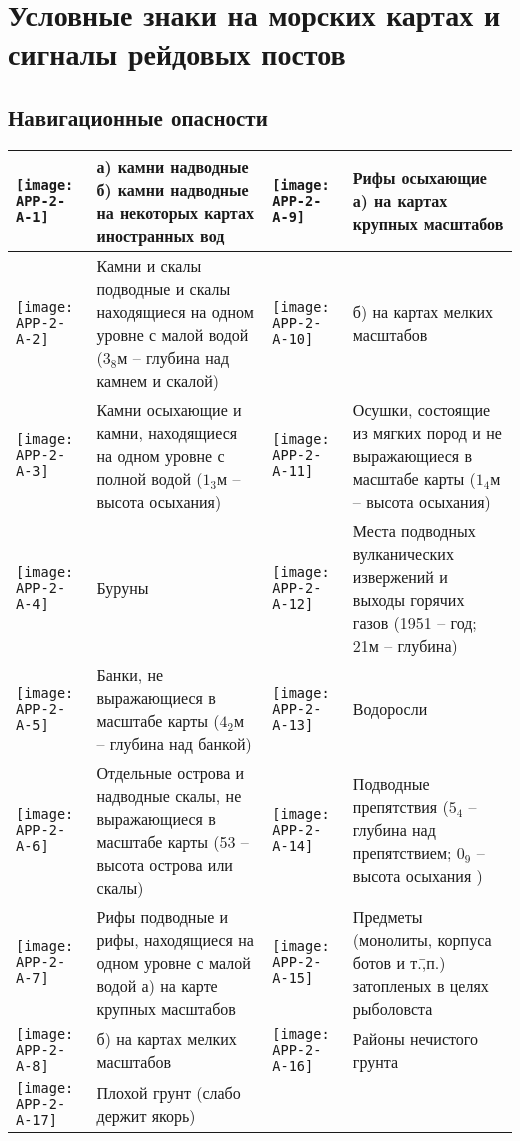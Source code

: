 \chapter{Условные знаки на морских картах и сигналы рейдовых постов}\label{app:2}

\section{Навигационные опасности}\label{app:2a}

\small
\begin{longtable}{M|m{0.2\textwidth}|M|m{0.2\textwidth}}
  \toprule
  \texttt{[image: APP-2-A-1]} & а) камни надводные \newline б) камни надводные на некоторых картах иностранных вод &
  \texttt{[image: APP-2-A-9]} & Рифы осыхающие \newline а) на картах крупных масштабов \\
  \midrule
  \texttt{[image: APP-2-A-2]} & Камни и скалы подводные и скалы находящиеся на одном уровне с малой водой ($3_8$м \--- глубина над камнем и скалой) &
  \texttt{[image: APP-2-A-10]} & б) на картах мелких масштабов \\
  \midrule
  \texttt{[image: APP-2-A-3]} & Камни осыхающие и камни, находящиеся на одном уровне с полной водой ($1_3$м \--- высота осыхания) &
  \texttt{[image: APP-2-A-11]} & Осушки, состоящие из мягких пород и не выражающиеся в масштабе карты ($1_4$м \--- высота осыхания)\\
  \midrule
  \texttt{[image: APP-2-A-4]} & Буруны &
  \texttt{[image: APP-2-A-12]} & Места подводных вулканических извержений и выходы горячих газов (1951 \--- год; 21м \--- глубина) \\
  \midrule
  \texttt{[image: APP-2-A-5]} & Банки, не выражающиеся в масштабе карты ($4_2$м \--- глубина над банкой) &
  \texttt{[image: APP-2-A-13]} & Водоросли \\
  \midrule
  \texttt{[image: APP-2-A-6]} &  Отдельные острова и надводные скалы, не выражающиеся в масштабе карты (53 \--- высота острова или скалы) &
  \texttt{[image: APP-2-A-14]} & Подводные препятствия ($5_4$ \--- глубина над препятствием; $0_9$ \--- высота осыхания ) \\
  \midrule
  \texttt{[image: APP-2-A-7]} & Рифы подводные и рифы, находящиеся на одном уровне с малой водой \newline а) на карте крупных масштабов &
  \texttt{[image: APP-2-A-15]} & Предметы (монолиты, корпуса ботов и т.\=,п.) затопленых в целях рыболовста \\
  \midrule
  \texttt{[image: APP-2-A-8]} & б) на картах мелких масштабов &
  \texttt{[image: APP-2-A-16]} & Районы нечистого грунта \\
  \midrule
  \texttt{[image: APP-2-A-17]} & Плохой грунт (слабо держит якорь) \\
  \bottomrule
\end{longtable}

